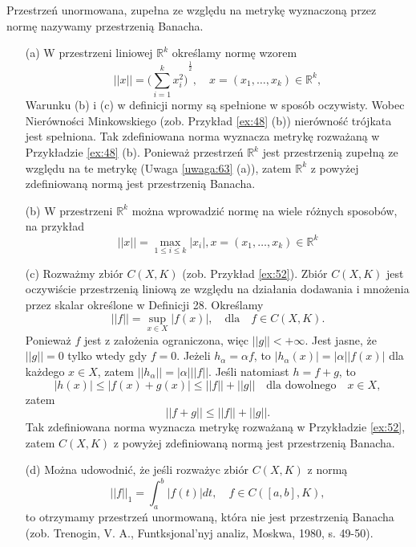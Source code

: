 \documentclass[leqno]{article}
\begin{document}
\begin{justify}
\begin{defn}
    Przestrzeń unormowana, zupełna ze względu na metrykę wyznaczoną przez normę nazywamy przestrzenią Banacha.
\end{defn}

\begin{ex}
    \begin{itemize}
        \item [(a)]
            W przestrzeni liniowej $\mathbb{R}^k$ określamy normę wzorem
            \[
                ||x|| = {\Big({\sum_{i=1}^{k}x_i^2}\Big)}^{\frac{1}{2}}, \quad x = (x_1, \ldots, x_k) \in \mathbb{R}^k,
            \]
            Warunku (b) i (c) w definicji normy są spełnione w sposób oczywisty.
            Wobec Nierówności Minkowskiego (zob. Przykład \ref{ex:48} (b)) nierówność trójkata jest spełniona.
            Tak zdefiniowana norma wyznacza metrykę rozważaną w Przykładzie \ref{ex:48} (b). 
            Ponieważ przestrzeń $\mathbb{R}^k$ jest przestrzenią zupełną ze względu na te metrykę 
            (Uwaga \ref{uwaga:63} (a)), zatem $\mathbb{R}^k$ z powyżej zdefiniowaną normą jest przestrzenią Banacha.
        \item [(b)]
            W przestrzeni $\mathbb{R}^k$ można wprowadzić normę na wiele różnych sposobów, na przykład
            \[
                ||x|| = \max_{1 \leqslant i \leqslant k}|x_i|, x = (x_1, \ldots, x_k) \in \mathbb{R}^k
            \]
        \item [(c)]
            Rozważmy zbiór $C(X, K)$ (zob. Przykład \ref{ex:52}). Zbiór $C(X, K)$ jest oczywiście przestrzenią liniową 
            ze względu na działania dodawania i mnożenia przez skalar określone w Definicji 28. Określamy 
            \[
                ||f|| = \sup_{x \in X}|f(x)|, \quad \text{dla} \quad f \in C(X, K).
            \]
            Ponieważ $f$ jest z założenia ograniczona, więc $||g|| < +\infty$.
            Jest jasne, że $||g|| = 0$ tylko wtedy gdy $f = 0$. Jeżeli $h_{\alpha} = \alpha f$, to
            $|h_\alpha(x)| = |\alpha||f(x)|$ dla każdego $x \in X$, 
            zatem $||h_\alpha|| = |\alpha|||f||$. Jeśli natomiast $h = f + g$, to 
            \[
                |h(x)| \leqslant |f(x) + g(x)| \leqslant ||f|| + ||g|| \quad \text{dla dowolnego} \quad x \in X,
            \]
            zatem
            \[
                ||f + g|| \leqslant ||f|| + ||g||.
            \]
            Tak zdefiniowana norma wyznacza metrykę rozważaną w Przykładzie \ref{ex:52}, zatem 
            $C(X, K)$ z powyżej zdefiniowaną normą jest przestrzenią Banacha.
        \item [(d)]
            Można udowodnić, że jeśli rozważyc zbiór $C(X, K)$ z normą 
            \[
                ||f||_1 = \int_{a}^{b}|f(t)|dt, \quad f \in C([a,b], K),
            \]
            to otrzymamy przestrzeń unormowaną, która nie jest przestrzenią Banacha
            (zob. Trenogin, V. A., Funtksjonal'nyj analiz, Moskwa, 1980, s. 49-50).
    \end{itemize}
\end{ex}


\end{justify}
\end{document}
